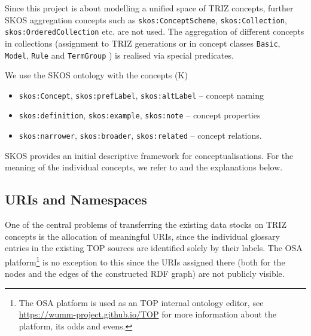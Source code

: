 \documentclass[11pt,a4paper]{article}
\begin{document}
Since this project is about modelling a unified space of TRIZ concepts,
further SKOS aggregation concepts such as \texttt{skos:ConceptScheme},
\texttt{skos:Collection}, \texttt{skos:OrderedCollection} etc. are not used.
The aggregation of different concepts in collections (assignment to TRIZ
generations \cite[Table 1]{TOP2020} or in concept classes \texttt{Basic},
\texttt{Model}, \texttt{Rule} and \texttt{TermGroup} \cite[Fig. 4]{TOP2020})
is realised via special predicates.

We use the SKOS ontology \cite{SKOS} with the concepts (K)
\begin{itemize}[noitemsep]
\item \texttt{skos:Concept}, \texttt{skos:prefLabel}, \texttt{skos:altLabel}
  -- concept naming
\item \texttt{skos:definition}, \texttt{skos:example}, \texttt{skos:note} --
  concept properties
\item \texttt{skos:narrower}, \texttt{skos:broader}, \texttt{skos:related} --
  concept relations.
\end{itemize}
SKOS provides an initial descriptive framework for conceptualisations.  For
the meaning of the individual concepts, we refer to \cite{SKOS} and the
explanations below.

\subsection{URIs and Namespaces}

One of the central problems of transferring the existing data stocks on TRIZ
concepts is the allocation of meaningful URIs, since the individual glossary
entries in the existing TOP sources are identified solely by their labels.
The OSA platform\footnote{The OSA platform is used as an TOP internal ontology
  editor, see \url{https://wumm-project.github.io/TOP} for more information
  about the platform, its odds and evens.} is no exception to this since the
URIs assigned there (both for the nodes and the edges of the constructed RDF
graph) are not publicly visible.
\end{document}
